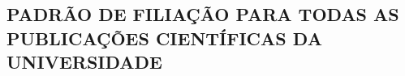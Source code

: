 
%

\begin{anexosenv}
	
	\chapter{PADRÃO DE FILIAÇÃO PARA TODAS AS PUBLICAÇÕES CIENTÍFICAS DA UNIVERSIDADE}
	
	
	
\end{anexosenv}